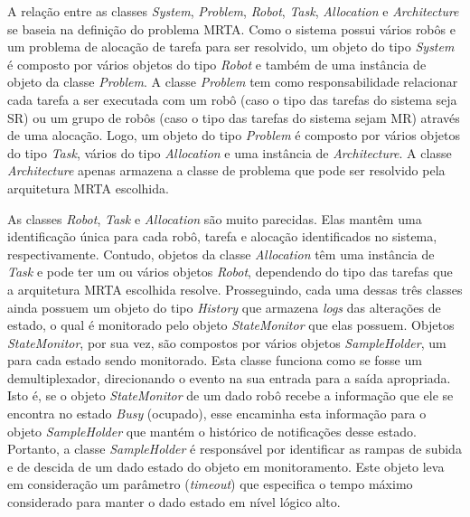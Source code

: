             A relação entre as classes \textit{System}, \textit{Problem}, \textit{Robot}, \textit{Task}, \textit{Allocation} e \textit{Architecture} se baseia na definição do problema MRTA. Como o sistema possui vários robôs e um problema de alocação de tarefa para ser resolvido, um objeto do tipo \textit{System} é composto por vários objetos do tipo \textit{Robot} e também de uma instância de objeto da classe \textit{Problem}. A classe \textit{Problem} tem como responsabilidade relacionar cada tarefa a ser executada com um robô (caso o tipo das tarefas do sistema seja SR) ou um grupo de robôs (caso o tipo das tarefas do sistema sejam MR) através de uma alocação. Logo, um objeto do tipo \textit{Problem} é composto por vários objetos do tipo \textit{Task}, vários do tipo \textit{Allocation} e uma instância de \textit{Architecture}. A classe \textit{Architecture} apenas armazena a classe de problema que pode ser resolvido pela arquitetura MRTA escolhida. 
            
            As classes \textit{Robot}, \textit{Task} e \textit{Allocation} são muito parecidas. Elas mantêm uma identificação única para cada robô, tarefa e alocação identificados no sistema, respectivamente. Contudo, objetos da classe \textit{Allocation} têm uma instância de \textit{Task} e pode ter um ou vários objetos \textit{Robot}, dependendo do tipo das tarefas que a arquitetura MRTA escolhida resolve. Prosseguindo, cada uma dessas três classes ainda possuem um objeto do tipo \textit{History} que armazena \textit{logs} das alterações de estado, o qual é monitorado pelo objeto \textit{StateMonitor} que elas possuem. Objetos \textit{StateMonitor}, por sua vez, são compostos por vários objetos \textit{SampleHolder}, um para cada estado sendo monitorado. Esta classe funciona como se fosse um demultiplexador, direcionando o evento na sua entrada para a saída apropriada. Isto é, se o objeto \textit{StateMonitor} de um dado robô recebe a informação que ele se encontra no estado \textit{Busy} (ocupado), esse encaminha esta informação para o objeto \textit{SampleHolder} que mantém o histórico de notificações desse estado. Portanto, a classe \textit{SampleHolder} é responsável por identificar as rampas de subida e de descida de um dado estado do objeto em monitoramento. Este objeto leva em consideração um parâmetro (\textit{timeout}) que especifica o tempo máximo considerado para manter o dado estado em nível lógico alto.
            
